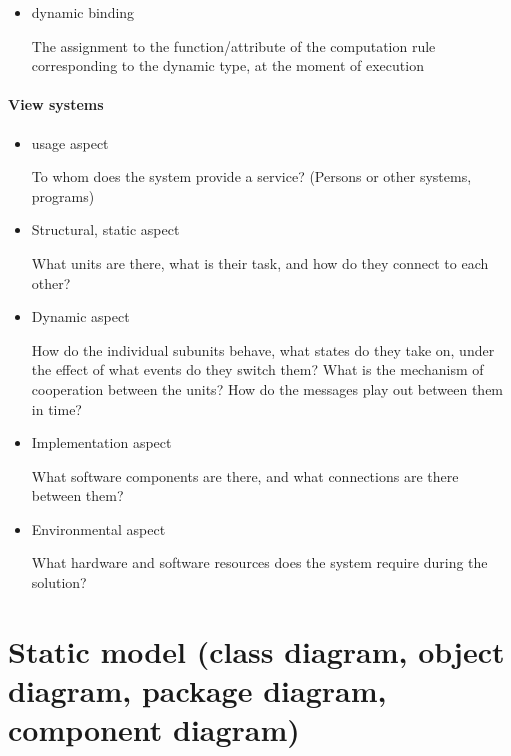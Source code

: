 \documentclass[margin=0px]{article}
\begin{document}
\begin{itemize}
\begin{itemize}
                    Every variable has two types: \textit{static} (received during declaration) and \textit{dynamic} (at the moment of declaration it coincides with the static one, but can later change, if we assign a subclass instance to a superclass instance)
              \item dynamic binding

                    The assignment to the function/attribute of the computation rule corresponding to the dynamic type, at the moment of execution
          \end{itemize}
          \paragraph{View systems}
          \begin{itemize}
              \item usage aspect

                    To whom does the system provide a service? (Persons or other systems, programs)

              \item Structural, static aspect

                    What units are there, what is their task, and how do they connect to each other?

              \item Dynamic aspect

                    How do the individual subunits behave, what states do they take on, under the effect of what events do they switch them? What is the mechanism of cooperation between the units? How do the messages play out between them in time?

              \item Implementation aspect

                    What software components are there, and what connections are there between them?

              \item Environmental aspect

                    What hardware and software resources does the system require during the solution?
          \end{itemize}
\end{itemize}
\section{Static model (class diagram, object diagram, package diagram, component diagram)}
\end{document}
